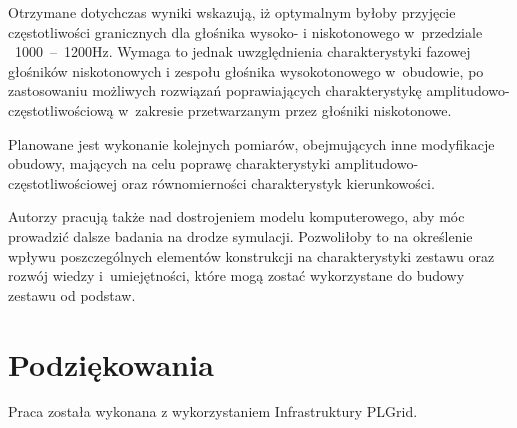 \documentclass[12pt]{oska}
\newcommand{\range}[2]{\num{#1}~--~\num{#2}}
\begin{document}
	Otrzymane dotychczas wyniki wskazują, iż optymalnym byłoby przyjęcie częstotliwości granicznych dla głośnika wysoko- i niskotonowego w~przedziale ~\range{1000}{1200}\si{Hz}. Wymaga to jednak uwzględnienia charakterystyki fazowej głośników niskotonowych i zespołu głośnika wysokotonowego w~obudowie, po zastosowaniu możliwych rozwiązań poprawiających charakterystykę amplitudowo-częstotliwościową w~zakresie przetwarzanym przez głośniki niskotonowe. 
	
	Planowane jest wykonanie kolejnych pomiarów, obejmujących inne modyfikacje obudowy, mających na celu poprawę charakterystyki amplitudowo-częstotliwościowej oraz równomierności charakterystyk kierunkowości. 
	
	Autorzy pracują także nad dostrojeniem modelu komputerowego, aby móc prowadzić dalsze badania na drodze symulacji. Pozwoliłoby to na określenie wpływu poszczególnych elementów konstrukcji na charakterystyki zestawu oraz rozwój wiedzy i~umiejętności, które mogą zostać wykorzystane do budowy zestawu od podstaw. 
	
	\section*{Podziękowania}
	
	Praca została wykonana z wykorzystaniem Infrastruktury PLGrid.
	
	
	\printbibliography
	
\end{document}
